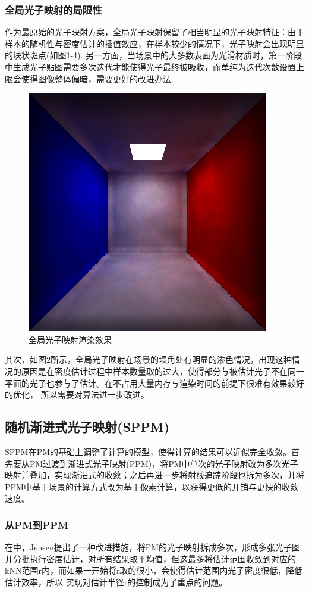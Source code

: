 \documentclass[12pt]{article}
\begin{document}
\subsubsection{全局光子映射的局限性}
作为最原始的光子映射方案，全局光子映射保留了相当明显的光子映射特征：由于样本的随机性与密度估计的插值效应，在样本较少的情况下，光子映射会出现明显的块状斑点(如图1-4).
另一方面，当场景中的大多数表面为光滑材质时，第一阶段中生成光子贴图需要多次迭代才能使得光子最终被吸收，而单纯为迭代次数设置上限会使得图像整体偏暗，需要更好的改进办法.

\begin{figure}[htbp]
    \centering
    \includegraphics[scale=0.6]{pic2.png}
    \caption{全局光子映射渲染效果}
\end{figure}
其次，如图2所示，全局光子映射在场景的墙角处有明显的渗色情况，出现这种情况的原因是在密度估计过程中样本数量取的过大，使得部分与被估计光子不在同一平面的光子也参与了估计。在不占用大量内存与渲染时间的前提下很难有效果较好的优化，
所以需要对算法进一步改进。

\subsection{随机渐进式光子映射(SPPM)}
SPPM在PM的基础上调整了计算的模型，使得计算的结果可以近似完全收敛。首先要从PM过渡到渐进式光子映射(PPM)，将PM中单次的光子映射改为多次光子映射并叠加，实现渐进式的收敛；之后再进一步将射线追踪阶段也拆为多次，并将PPM中基于场景的计算方式改为基于像素计算，以获得更低的开销与更快的收敛速度。

\subsubsection{从PM到PPM}
在\cite{7}中，Jensen提出了一种改进措施，将PM的光子映射拆成多次，形成多张光子图并分批执行密度估计，对所有结果取平均值，但这最多将估计范围收敛到对应的kNN范围r内，而如果一开始将r取的很小，会使得估计范围内光子密度很低，降低估计效率，所以
实现对估计半径r的控制成为了重点的问题。
\end{document}
